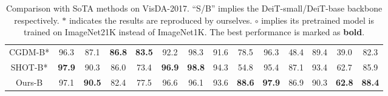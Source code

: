 \documentclass[dvipsnames, svgnames, x11names, table]{article} \usepackage{iclr2022_conference,times}
\begin{document}
\begin{spacing}{1.0}
\begin{table*}[!t]
\begin{tabular}{c|cccccccccccc>{\columncolor{lightgray}}c}
CGDM-B* & 96.3 & 87.1 & \textbf{86.8} & \textbf{83.5} & 92.2 & 98.3 & 91.6 & 78.5 & 96.3 & 48.4 & 89.4 & 39.0 & 82.3 \\
SHOT-B* & \textbf{97.9} & 90.3 & 86.0 & 73.4 & \textbf{96.9} & \textbf{98.8} & 94.3 & 54.8 & 95.4 & 87.1 & 93.4 & 62.7 & 85.9 \\
Ours-B & 97.1 & \textbf{90.5} & 82.4 & 77.5 & 96.6 & 96.1 & 93.6 & \textbf{88.6} & \textbf{97.9} & 86.9 & 90.3 & \textbf{62.8} & \textbf{88.4} \\
\hline
\end{tabular}
\vspace{-2mm}
\caption{Comparison with SoTA methods on VisDA-2017. ``S/B'' implies the DeiT-small/DeiT-base backbone respectively. $*$ indicates the results are reproduced by ourselves. ${\circ}$ implies its pretrained model is trained on ImageNet21K instead of ImageNet1K. The best performance is marked as \textbf{bold}.}
\label{tab:visda}
\vspace{-1mm}
\end{table*}


\end{spacing}
\end{document}
